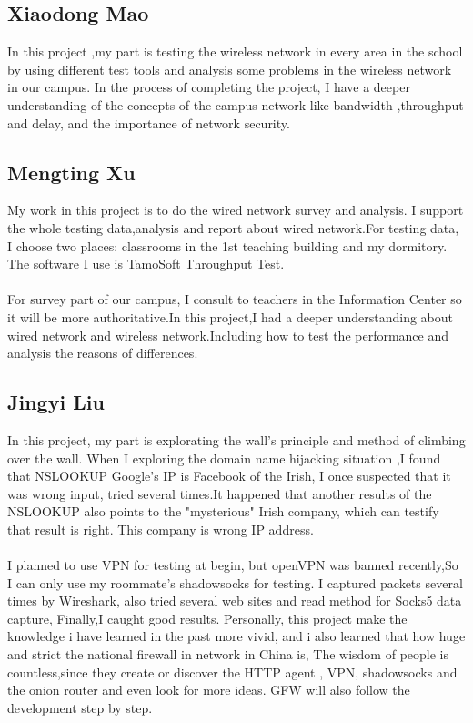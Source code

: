 \documentclass[paper=a4, fontsize=11pt]{scrartcl}
\numberwithin{equation}{section}
\numberwithin{figure}{section}
\numberwithin{table}{section}
\begin{document}
\subsection{Xiaodong Mao}
In this project ,my part is testing the wireless network in every area in the school by using different test tools and analysis some problems in the wireless network in our campus. In the process of completing the project, I have a deeper understanding of the concepts of the campus network like bandwidth ,throughput and delay, and the importance of network security.
\subsection{Mengting Xu}
My work in this project is to do the wired network survey and analysis. I support the whole testing data,analysis and report about wired network.For testing data, I choose two places: classrooms in the 1st teaching building and my dormitory. The software I use is TamoSoft Throughput Test.
\paragraph{} 
For survey part of our campus, I consult to teachers in the Information Center so it will be more authoritative.In this project,I had a deeper understanding about wired network and wireless network.Including how to test the performance and analysis the reasons of differences.
\subsection{Jingyi Liu}
In this project, my part is explorating the wall's principle and method of climbing over the wall.
When I exploring the domain name hijacking situation ,I found that NSLOOKUP Google's IP is Facebook of the Irish, I once  suspected that it was wrong input, tried several times.It happened that another results of the NSLOOKUP also points to the "mysterious" Irish company, which can testify that result is right. This company is wrong IP address.
\paragraph{} 
I planned to use VPN for testing at begin, but openVPN was banned recently,So I can only use my roommate's shadowsocks for testing. I captured packets several times by Wireshark, also tried several web sites and read method for Socks5 data capture, Finally,I caught good results.
Personally, this project make the knowledge i have learned in the past more vivid, and i also learned that how huge and strict the national firewall in network in China is, The wisdom of people is countless,since they create or discover the HTTP agent , VPN, shadowsocks and the onion router and even look for more ideas. GFW will also follow the development step by step.
\newpage
{}


\end{document}
